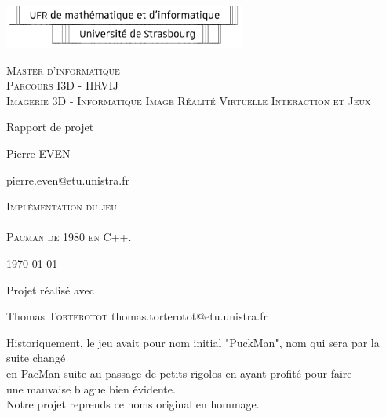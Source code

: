 \documentclass [twoside,a4paper,11pt,french] {report}
\begin{document}

\begin{center}
    \includegraphics [width=8cm] {logo-ufr.pdf}       

    \vfill

    {
	\large
	\textsc{
	    Master d'informatique \\
	    Parcours I3D - IIRVIJ \\
		Imagerie 3D - Informatique Image Réalité Virtuelle Interaction et Jeux
	}
    }

    \bigskip\bigskip
    \bigskip\bigskip

    {\huge Rapport de projet}

    \bigskip\bigskip

    {\large Pierre \textsc{EVEN}}

    {\small pierre.even@etu.unistra.fr}

    
    \vfill

    {
	\huge
	\textsc{
		Implémentation du jeu \\
	    ~ \\
        Pacman de 1980 en C++.
	}
    }

    \vfill
    \vfill

    \today

    \vfill

    {\large Projet réalisé avec}

    \medskip

    {
		\large Thomas \textsc{Torterotot} \small{thomas.torterotot@etu.unistra.fr}
	}

    \bigskip

    \bigskip
\end{center}


{
    \parskip=0pt
    \tableofcontents
}
\begin{center}
    Historiquement, le jeu avait pour nom initial "PuckMan", nom qui sera par la suite changé \\
    en PacMan suite au passage de petits rigolos en ayant profité pour faire\\
    une mauvaise blague bien évidente.
    ~ \\
    Notre projet reprends ce noms original en hommage.
\end{center}
\end{document}
